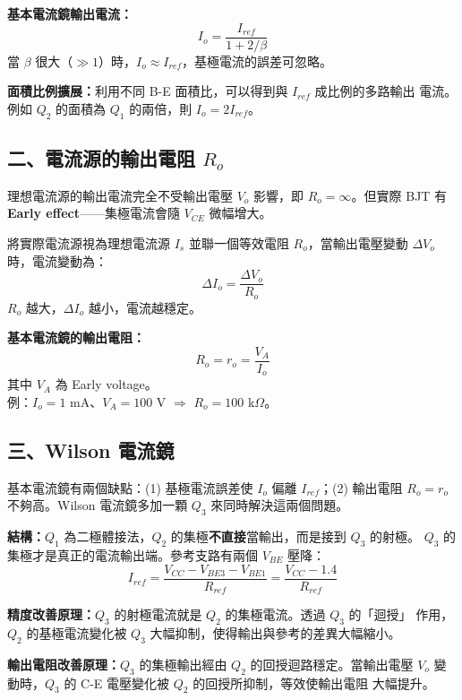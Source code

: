 \documentclass[12pt]{article}
\begin{document}
\begin{formulabox}
\textbf{基本電流鏡輸出電流：}
\[
  I_o = \frac{I_{ref}}{1 + 2/\beta} \tag{12.26}
\]
當 $\beta$ 很大（$\gg 1$）時，$I_o \approx I_{ref}$，基極電流的誤差可忽略。
\end{formulabox}

\noindent\textbf{面積比例擴展：}利用不同 B-E 面積比，可以得到與 $I_{ref}$ 成比例的多路輸出
電流。例如 $Q_2$ 的面積為 $Q_1$ 的兩倍，則 $I_o = 2I_{ref}$。

\subsection*{二、電流源的輸出電阻 $R_o$}

\begin{keybox}[為什麼輸出電阻很重要？]
理想電流源的輸出電流完全不受輸出電壓 $V_o$ 影響，即 $R_o = \infty$。但實際 BJT
有 \textbf{Early effect}——集極電流會隨 $V_{CE}$ 微幅增大。

\medskip
將實際電流源視為理想電流源 $I_s$ 並聯一個等效電阻 $R_o$，當輸出電壓變動
$\Delta V_o$ 時，電流變動為：
\[
  \Delta I_o = \frac{\Delta V_o}{R_o} \tag{12.30}
\]
$R_o$ 越大，$\Delta I_o$ 越小，電流越穩定。
\end{keybox}

\begin{formulabox}
\textbf{基本電流鏡的輸出電阻：}
\[
  R_o = r_o = \frac{V_A}{I_o} \tag{12.31}
\]
其中 $V_A$ 為 Early voltage。\\
例：$I_o = 1$ mA、$V_A = 100$ V $\Rightarrow$ $R_o = 100$ k$\Omega$。
\end{formulabox}

\subsection*{三、Wilson 電流鏡}


\begin{keybox}
基本電流鏡有兩個缺點：(1) 基極電流誤差使 $I_o$ 偏離 $I_{ref}$；(2) 輸出電阻
$R_o = r_o$ 不夠高。Wilson 電流鏡多加一顆 $Q_3$ 來同時解決這兩個問題。

\medskip
\textbf{結構：}$Q_1$ 為二極體接法，$Q_2$ 的集極\textbf{不直接}當輸出，而是接到 $Q_3$ 的射極。
$Q_3$ 的集極才是真正的電流輸出端。參考支路有兩個 $V_{BE}$ 壓降：
\[
  I_{ref} = \frac{V_{CC} - V_{BE3} - V_{BE1}}{R_{ref}} = \frac{V_{CC} - 1.4}{R_{ref}} \tag{12.32}
\]

\textbf{精度改善原理：}$Q_3$ 的射極電流就是 $Q_2$ 的集極電流。透過 $Q_3$ 的「迴授」
作用，$Q_2$ 的基極電流變化被 $Q_3$ 大幅抑制，使得輸出與參考的差異大幅縮小。

\textbf{輸出電阻改善原理：}$Q_3$ 的集極輸出經由 $Q_2$ 的回授迴路穩定。當輸出電壓
$V_o$ 變動時，$Q_3$ 的 C-E 電壓變化被 $Q_2$ 的回授所抑制，等效使輸出電阻
大幅提升。
\end{keybox}
\end{document}
